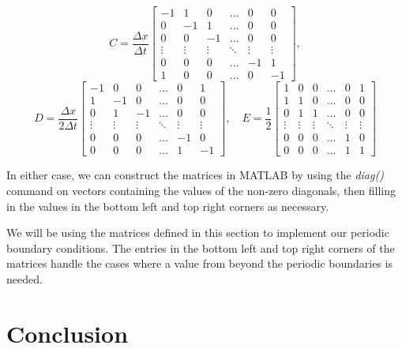 \documentclass{myproject}
\begin{document}
\[
C = \frac{\Delta x}{\Delta t}
\begin{bmatrix}
-1 & 1 & 0 & \dots & 0 & 0 \\
0 & -1 & 1 & \dots & 0 & 0 \\
0 & 0 & -1 & \dots & 0 & 0 \\
\vdots & \vdots & \vdots & \ddots & \vdots & \vdots \\
0 & 0 & 0 & \dots & -1 & 1 \\
1 & 0 & 0 & \dots & 0 & -1
\end{bmatrix},
\]
\[
D = \frac{\Delta x}{2 \Delta t}
\begin{bmatrix}
-1 & 0 & 0 & \dots & 0 & 1 \\
1 & -1 & 0 & \dots & 0 & 0 \\
0 & 1 & -1 & \dots & 0 & 0 \\
\vdots & \vdots & \vdots & \ddots & \vdots & \vdots \\
0 & 0 & 0 & \dots & -1 & 0 \\
0 & 0 & 0 & \dots & 1 & -1
\end{bmatrix},
\quad
E = \frac{1}{2}
\begin{bmatrix}
1 & 0 & 0 & \dots & 0 & 1 \\
1 & 1 & 0 & \dots & 0 & 0 \\
0 & 1 & 1 & \dots & 0 & 0 \\
\vdots & \vdots & \vdots & \ddots & \vdots & \vdots \\
0 & 0 & 0 & \dots & 1 & 0 \\
0 & 0 & 0 & \dots & 1 & 1
\end{bmatrix}
\]

In either case, we can construct the matrices in MATLAB by using the \textit{diag()} command on vectors containing the values of the non-zero diagonals, then filling in the values in the bottom left and top right corners as necessary.

We will be using the matrices defined in this section to implement our periodic boundary conditions. The entries in the bottom left and top right corners of the matrices handle the cases where a value from beyond the periodic boundaries is needed.

\section{Conclusion}

\nocite{iserles2009}
\nocite{trefethen2000}
\nocite{leveque1992}
\nocite{leveque2002}
\printbibliography
\end{document}
